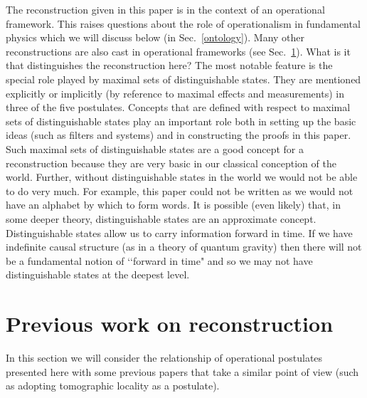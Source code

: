 \documentclass[10pt]{article}
\begin{document}
The reconstruction given in this paper is in the context of an operational framework.   This raises questions about the role of operationalism in fundamental physics which we will discuss below (in Sec.\ \ref{ontology}).   Many other reconstructions are also cast in operational frameworks (see Sec.\ \ref{previouswork}).  What is it that distinguishes the reconstruction here?  The most notable feature is the special role played by maximal sets of distinguishable states.  They are mentioned explicitly or implicitly (by reference to maximal effects and measurements) in three of the five postulates.  Concepts that are defined with respect to maximal sets of distinguishable states play an important role both in setting up the basic ideas (such as filters and systems) and in constructing the proofs in this paper.  Such maximal sets of distinguishable states are a good concept for a reconstruction because they are very basic in our classical conception of the world.  Further, without distinguishable states in the world we would not be able to do very much.  For example, this paper could not be written as we would not have an alphabet by which to form words.  It is possible (even likely) that, in some deeper theory, distinguishable states are an approximate concept.   Distinguishable states allow us to carry information forward in time.  If we have indefinite causal structure (as in a theory of quantum gravity) then there will not be a fundamental notion of \lq\lq forward in time" and so we may not have distinguishable states at the deepest level.




\section{Previous work on reconstruction}\label{previouswork}

In this section we will consider the relationship of operational postulates presented here with some previous papers that take a similar point of view (such as adopting tomographic locality as a postulate).
\end{document}
